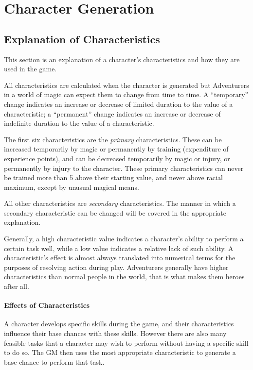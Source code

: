 \chapter*{Character Generation}

\begin{multicols*}{3}

\section{Explanation of Characteristics}

This section is an explanation of a character's characteristics and
how they are used in the game.

All characteristics are calculated when the character is generated but
Adventurers in a world of magic can expect them to change from time to
time.  A ``temporary'' change indicates an increase or decrease of
limited duration to the value of a characteristic; a ``permanent''
change indicates an increase or decrease of indefinite duration to the
value of a characteristic.

The first six characteristics are the \emph{primary} characteristics.
These can be increased temporarily by magic or permanently by training
(expenditure of experience points), and can be decreased temporarily
by magic or injury, or permanently by injury to the character. These
primary characteristics can never be trained more than 5 above their
starting value, and never above racial maximum, except by unusual
magical means.

All other characteristics are \emph{secondary} characteristics. The
manner in which a secondary characteristic can be changed will be
covered in the appropriate explanation.

Generally, a high characteristic value indicates a character's ability
to perform a certain task well, while a low value indicates a relative
lack of such ability. A characteristic's effect is almost always
translated into numerical terms for the purposes of resolving action
during play.  Adventurers generally have higher characteristics than
normal people in the world, that is what makes them heroes after all.

\subsubsection{Effects of Characteristics}

A character develops specific skills during the game, and their
characteristics influence their base chances with these skills.
However there are also many feasible tasks that a character may wish
to perform without having a specific skill to do so.  The GM then uses
the most appropriate characteristic to generate a base chance to
perform that task.


\end{multicols*}
